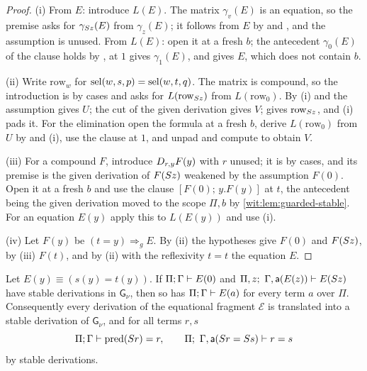 \begin{proof}
(i) From $E$: introduce $L(E)$.  The matrix $\gamma_v(E)$ is an equation,
so the premise asks for $\gamma_{S z}(E)$ from $\gamma_z(E)$; it follows
from $E$ by  and , and the assumption is unused.
From $L(E)$: open it at a fresh $b$; the antecedent $\gamma_0(E)$ of the
clause holds by ,  at $1$ gives $\gamma_1(E)$,
and  gives $E$, which does not contain $b$.

(ii) Write $\mathrm{row}_w$ for $\operatorname{sel}(w,s,p)=\operatorname{sel}(w,t,q)$.  The matrix is
compound, so the introduction is by cases and asks for
$L(\mathrm{row}_{S z})$ from $L(\mathrm{row}_0)$.  By (i) and
 the assumption gives $U$; the cut of the given derivation
gives $V$;  gives $\mathrm{row}_{S z}$, and (i) pads it.
For the elimination open the formula at a fresh $b$, derive
$L(\mathrm{row}_0)$ from $U$ by  and (i), use the clause at
$1$, and unpad and compute to obtain $V$.

(iii) For a compound $F$, introduce $D_{r,y}F(y)$ with $r$ unused; it is
by cases, and its premise is the given derivation of $F(S z)$ weakened by
the assumption $F(0)$.  Open it at a fresh $b$ and use the clause
$[F(0);\,y.F(y)]$ at $t$, the antecedent being the given derivation moved to
the scope $\Pi,b$ by \cref{wit:lem:guarded-stable}.  For an equation $E(y)$
apply this to $L(E(y))$ and use (i).

(iv) Let $F(y)$ be $(t=y)\Rightarrow_{g}E$.  By (ii) the hypotheses give
$F(0)$ and $F(S z)$, by (iii) $F(t)$, and by (ii) with the reflexivity
$t=t$ the equation $E$.
\end{proof}

\begin{lemma}
\label{wit:lem:guarded-ei}
Let $E(y)\equiv(s(y)=t(y))$.  If $\Pi;\Gamma\vdash E(0)$ and
$\Pi,z;\ \Gamma,\mathsf{a}(E(z))\vdash E(S z)$ have stable derivations
in $\mathsf{G}_{\nu}$, then so has $\Pi;\Gamma\vdash E(a)$ for every term
$a$ over $\Pi$.  Consequently every derivation of the equational fragment
$\mathcal E$ is translated into a stable derivation of $\mathsf{G}_{\nu}$,
and for all terms $r,s$
\[
 \Pi;\Gamma\vdash\operatorname{pred}(S r)=r,
 \qquad
 \Pi;\ \Gamma,\mathsf{a}(S r=S s)\vdash r=s
\]
by stable derivations.
\end{lemma}

